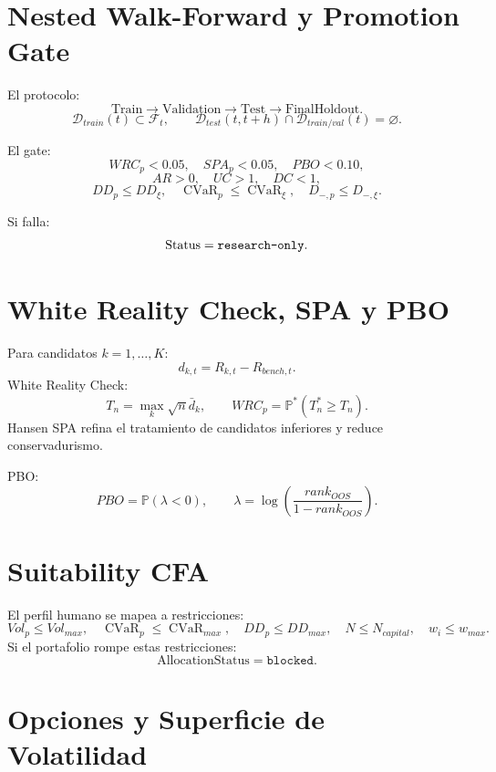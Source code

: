 \documentclass[11pt,letterpaper]{article}
\DeclareMathOperator{\CVaR}{CVaR}
\newcommand{\Prob}{\mathbb{P}}
\newcommand{\F}{\mathcal{F}}
\newcommand{\D}{\mathcal{D}}
\newcommand{\1}{\mathbbm{1}}
\begin{document}
\section{Nested Walk-Forward y Promotion Gate}

El protocolo:
\[
\mathrm{Train}\rightarrow\mathrm{Validation}\rightarrow\mathrm{Test}\rightarrow\mathrm{FinalHoldout}.
\]
\[
\D_{train}(t)\subset\F_t,
\qquad
\D_{test}(t,t+h)\cap\D_{train/val}(t)=\varnothing.
\]

El gate:
\[
WRC_p<0.05,\quad
SPA_p<0.05,\quad
PBO<0.10,
\]
\[
AR>0,\quad
UC>1,\quad
DC<1,
\]
\[
DD_p\le DD_\xi,\quad
\CVaR_p\le\CVaR_\xi,\quad
D_{-,p}\le D_{-,\xi}.
\]

Si falla:
\[
\mathrm{Status}=\texttt{research\mbox{-}only}.
\]

\section{White Reality Check, SPA y PBO}

Para candidatos \(k=1,\dots,K\):
\[
d_{k,t}=R_{k,t}-R_{bench,t}.
\]
White Reality Check:
\[
T_n=\max_k\sqrt{n}\bar{d}_k,
\qquad
WRC_p=\Prob^*(T_n^*\ge T_n).
\]
Hansen SPA refina el tratamiento de candidatos inferiores y reduce conservadurismo.

PBO:
\[
PBO=\Prob(\lambda<0),
\qquad
\lambda=\log\left(\frac{rank_{OOS}}{1-rank_{OOS}}\right).
\]

\section{Suitability CFA}

El perfil humano se mapea a restricciones:
\[
Vol_p\le Vol_{max},
\quad
\CVaR_p\le\CVaR_{max},
\quad
DD_p\le DD_{max},
\quad
N\le N_{capital},
\quad
w_i\le w_{max}.
\]
Si el portafolio rompe estas restricciones:
\[
\mathrm{AllocationStatus}=\texttt{blocked}.
\]

\section{Opciones y Superficie de Volatilidad}
\end{document}
